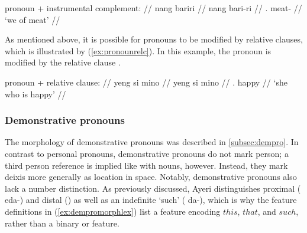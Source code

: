 \a\ljudge* %
	\begin{minipage}[t]{.5\linewidth}
	\begingl
		\glpreamble pronoun + instrumental complement: //
		\gla nang bariri //
		\glb nang bari-ri //
		\glc \Fpl{}.\Aarg{} meat-\Ins{} //
		\glft `we of meat' //
	\endgl
	\end{minipage}

\xe

As mentioned above, it is possible for pronouns to be modified by relative
clauses, which is illustrated by (\ref{ex:pronounrelc}). In this example, the
pronoun  is modified by the relative clause .

\ex\label{ex:pronounrelc} %
	\begin{minipage}[t]{.5\linewidth}
	\begingl
		\glpreamble pronoun + relative clause: //
		\gla yeng si mino //
		\glb yeng si mino //
		\glc \TsgF{}.\Aarg{} \Rel{} happy //
		\glft `she who is happy' //
	\endgl
	\end{minipage}
\xe

\subsubsection{Demonstrative pronouns}

The morphology of demonstrative pronouns was described in 
\autoref{subsec:dempro}. In contrast to personal pronouns, demonstrative
pronouns do not mark person; a third person reference is implied like with
nouns, however. Instead, they mark deixis more generally as location in space.
Notably, demonstrative pronouns also lack a number distinction. As previously
discussed, Ayeri distinguishes proximal ( {eda-}) and distal
() as well as an indefinite `such' ( {da-}), which is
why the feature definitions in (\ref{ex:dempromorphlex}) list a \Deix{} feature
encoding $this$, $that$, and $such$, rather than a binary \Prox{} or \Dist{}
feature.

